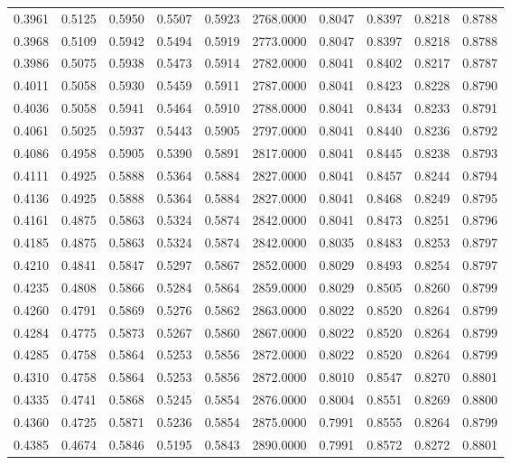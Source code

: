 \begin{tabular}{rrrrrrrrrr}
0.3961 & 0.5125 & 0.5950 & 0.5507 & 0.5923 & 2768.0000 & 0.8047 & 0.8397 & 0.8218 & 0.8788 \\
0.3968 & 0.5109 & 0.5942 & 0.5494 & 0.5919 & 2773.0000 & 0.8047 & 0.8397 & 0.8218 & 0.8788 \\
0.3986 & 0.5075 & 0.5938 & 0.5473 & 0.5914 & 2782.0000 & 0.8041 & 0.8402 & 0.8217 & 0.8787 \\
0.4011 & 0.5058 & 0.5930 & 0.5459 & 0.5911 & 2787.0000 & 0.8041 & 0.8423 & 0.8228 & 0.8790 \\
0.4036 & 0.5058 & 0.5941 & 0.5464 & 0.5910 & 2788.0000 & 0.8041 & 0.8434 & 0.8233 & 0.8791 \\
0.4061 & 0.5025 & 0.5937 & 0.5443 & 0.5905 & 2797.0000 & 0.8041 & 0.8440 & 0.8236 & 0.8792 \\
0.4086 & 0.4958 & 0.5905 & 0.5390 & 0.5891 & 2817.0000 & 0.8041 & 0.8445 & 0.8238 & 0.8793 \\
0.4111 & 0.4925 & 0.5888 & 0.5364 & 0.5884 & 2827.0000 & 0.8041 & 0.8457 & 0.8244 & 0.8794 \\
0.4136 & 0.4925 & 0.5888 & 0.5364 & 0.5884 & 2827.0000 & 0.8041 & 0.8468 & 0.8249 & 0.8795 \\
0.4161 & 0.4875 & 0.5863 & 0.5324 & 0.5874 & 2842.0000 & 0.8041 & 0.8473 & 0.8251 & 0.8796 \\
0.4185 & 0.4875 & 0.5863 & 0.5324 & 0.5874 & 2842.0000 & 0.8035 & 0.8483 & 0.8253 & 0.8797 \\
0.4210 & 0.4841 & 0.5847 & 0.5297 & 0.5867 & 2852.0000 & 0.8029 & 0.8493 & 0.8254 & 0.8797 \\
0.4235 & 0.4808 & 0.5866 & 0.5284 & 0.5864 & 2859.0000 & 0.8029 & 0.8505 & 0.8260 & 0.8799 \\
0.4260 & 0.4791 & 0.5869 & 0.5276 & 0.5862 & 2863.0000 & 0.8022 & 0.8520 & 0.8264 & 0.8799 \\
0.4284 & 0.4775 & 0.5873 & 0.5267 & 0.5860 & 2867.0000 & 0.8022 & 0.8520 & 0.8264 & 0.8799 \\
0.4285 & 0.4758 & 0.5864 & 0.5253 & 0.5856 & 2872.0000 & 0.8022 & 0.8520 & 0.8264 & 0.8799 \\
0.4310 & 0.4758 & 0.5864 & 0.5253 & 0.5856 & 2872.0000 & 0.8010 & 0.8547 & 0.8270 & 0.8801 \\
0.4335 & 0.4741 & 0.5868 & 0.5245 & 0.5854 & 2876.0000 & 0.8004 & 0.8551 & 0.8269 & 0.8800 \\
0.4360 & 0.4725 & 0.5871 & 0.5236 & 0.5854 & 2875.0000 & 0.7991 & 0.8555 & 0.8264 & 0.8799 \\
0.4385 & 0.4674 & 0.5846 & 0.5195 & 0.5843 & 2890.0000 & 0.7991 & 0.8572 & 0.8272 & 0.8801 \\

\end{tabular}
